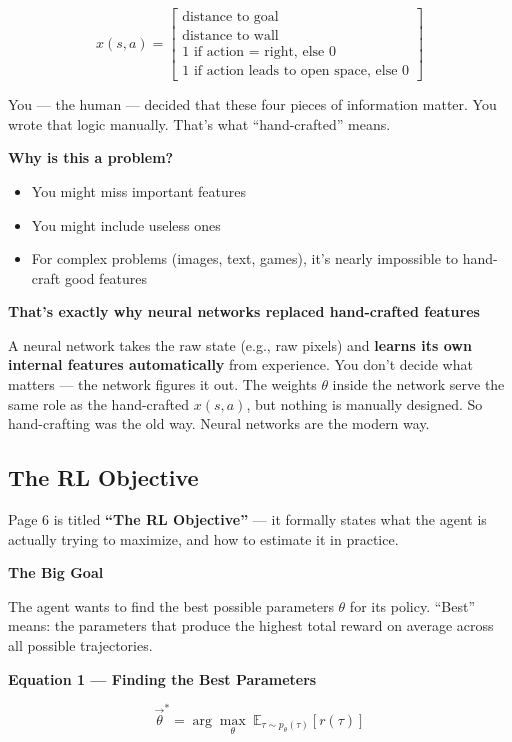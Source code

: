 \[
x(s, a) = \begin{bmatrix} \text{distance to goal} \\ \text{distance to wall} \\ \text{1 if action = right, else 0} \\ \text{1 if action leads to open space, else 0} \end{bmatrix}
\]

You --- the human --- decided that these four pieces of information matter. You wrote that logic manually. That's what ``hand-crafted'' means.

\textbf{Why is this a problem?}

\begin{itemize}
    \item You might miss important features
    \item You might include useless ones
    \item For complex problems (images, text, games), it's nearly impossible to hand-craft good features
\end{itemize}

\textbf{That's exactly why neural networks replaced hand-crafted features}

A neural network takes the raw state (e.g., raw pixels) and \textbf{learns its own internal features automatically} from experience. You don't decide what matters --- the network figures it out. The weights $\theta$ inside the network serve the same role as the hand-crafted $x(s, a)$, but nothing is manually designed. So hand-crafting was the old way. Neural networks are the modern way.


\subsection{The RL Objective}

Page 6 is titled \textbf{``The RL Objective''} --- it formally states what the agent is actually trying to maximize, and how to estimate it in practice.

\textbf{The Big Goal}

The agent wants to find the best possible parameters $\theta$ for its policy. ``Best'' means: the parameters that produce the highest total reward on average across all possible trajectories.

\textbf{Equation 1 --- Finding the Best Parameters}

\[
\vec{\theta}^* = \arg\max_{\theta} \ \mathbb{E}_{\tau \sim p_\theta(\tau)} \left[ r(\tau) \right]
\]

